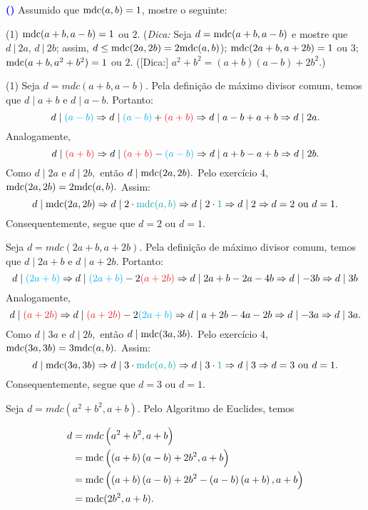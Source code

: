 \documentclass[12pt, a4paper]{article}
\newcommand{\mdc}{{\rm mdc}}
\newcommand{\negrito}[1]{\mbox{\boldmath{$#1$}}}
\newcounter{exercicio}[section]
\newenvironment{exercicio}[1][]{\refstepcounter{exercicio}\par\medskip
 \textcolor{blue}{\bf(\theexercicio)} \rmfamily}{\medskip }
\newcommand{\itens}[1]{\begin{tasks}[label={(tsk[a])},label-width=3.6ex, label-format = {\bfseries}, column-sep = {0pt}](1) #1\end{tasks}}
\newcommand{\alt}[1]{\textcolor{Floresta}{$\negrito{(#1)} $}}
\begin{document}
\newpage
\begin{exercicio}
Assumido que $\mdc(a,b)=1$, mostre o seguinte:
\itens{
\task[\alt{a}] $\mdc(a+b,a-b)=1$ ou $2$. (\textit{Dica:} Seja $d=\mdc(a+b,a-b)$ e mostre que $d\ | \ 2a$, $d\ | \ 2b$; assim, $d\leq \mdc(2a,2b)=2\mdc(a,b)$);
\task[\alt{b}] $\mdc(2a+b,a+2b)=1$ ou $3$;
\task[\alt{c}]  $\mdc(a+b,a^2+b^2)=1$ ou $2$. (\textsf{[Dica:]} $a^2+b^2=(a+b)(a-b)+2b^2$.)
}
\end{exercicio}
\begin{solution}
\itens{
\task[\alt{a}] Seja $d=mdc \left( a+b,a-b \right)$. Pela definição de máximo divisor comum, temos que $d \mid a + b$ e $d \mid a - b.$ Portanto:
\[
d \mid \textcolor{Cyan}{(a-b)} \Rightarrow d \mid \textcolor{Cyan}{(a-b)} + \textcolor{Red}{(a+b)} \Rightarrow d \mid a - b + a + b \Rightarrow d \mid 2a.
\]
Analogamente,
\[
d \mid \textcolor{Red}{(a+b)} \Rightarrow d \mid \textcolor{Red}{(a+b)} - \textcolor{Cyan}{(a-b)} \Rightarrow d \mid a + b - a + b \Rightarrow d \mid 2b.
\]
Como $d \mid 2a$ e $d \mid 2b,$ então $d \mid \mdc(2a, 2b).$ Pelo exercício 4, $\mdc(2a,2b) = 2 \mdc(a,b).$ Assim:
\[
d \mid \mdc(2a,2b) \Rightarrow d \mid 2 \cdot \textcolor{Emerald}{\mdc(a,b)} \Rightarrow d \mid 2 \cdot \textcolor{Emerald}{1} \Rightarrow d \mid 2 \Rightarrow d = 2 \mbox{ ou } d = 1.
\]
Consequentemente, segue que $d = 2$ ou $d = 1.$

\task[\alt{b}]  Seja $d=mdc \left( 2a+b,a+2b \right)$. Pela definição de máximo divisor comum, temos que $d \mid 2a + b$ e $d \mid a + 2b.$ Portanto:
\[
d \mid \textcolor{Cyan}{(2a+b)} \Rightarrow d \mid \textcolor{Cyan}{(2a+b)} - 2\textcolor{Red}{(a+2b)} \Rightarrow d \mid 2a +b - 2a - 4b \Rightarrow d \mid -3b \Rightarrow d \mid 3b
\]
Analogamente,
\[
d \mid \textcolor{Red}{(a+2b)} \Rightarrow d \mid \textcolor{Red}{(a+2b)} - 2\textcolor{Cyan}{(2a+b)} \Rightarrow d \mid a + 2b - 4a - 2b \Rightarrow d \mid -3a \Rightarrow d \mid 3a.
\]
Como $d \mid 3a$ e $d \mid 2b,$ então $d \mid \mdc(3a, 3b).$ Pelo exercício 4, $\mdc(3a,3b) = 3 \mdc(a,b).$ Assim:
\[
d \mid \mdc(3a,3b) \Rightarrow d \mid 3 \cdot \textcolor{Emerald}{\mdc(a,b)} \Rightarrow d \mid 3 \cdot \textcolor{Emerald}{1} \Rightarrow d \mid 3 \Rightarrow d = 3 \mbox{ ou } d = 1.
\]
Consequentemente, segue que $d = 3$ ou $d = 1.$

\task[\alt{c}]  Seja $d=mdc \left(a^2 + b^2, a + b \right)$. Pelo Algoritmo de Euclides, temos

\begin{align*}
    d &= mdc\left( a^{2}+b^{2},a+b \right) \\&=
    \mdc \left(  \left( a+b \right)  \left( a-b \right) +2b^{2},a+b \right) \\&= \mdc \left(  \left( a+b \right)  \left( a-b \right) +2b^{2}- \left( a-b \right)  \left( a+b \right) ,a+b \right) \\&= \mdc (2b^2, a +b ).
\end{align*}

}
\end{solution}
\end{document}
